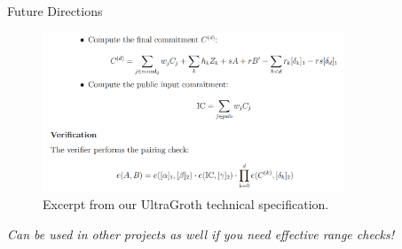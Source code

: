 \documentclass{zkdl-presentation-template}
\begin{document}
    \begin{frame}{Future Directions}
        \setlength{\fboxrule}{1.5pt}

            \begin{figure}
                \centering
                \includegraphics[width=0.8\textwidth]{images/ultragroth.png}
                \caption{Excerpt from our UltraGroth technical specification.}
            \end{figure}

            \begin{center}
                \textit{Can be used in other projects as well if you need effective range checks!}
            \end{center}
    \end{frame}
\end{document}
